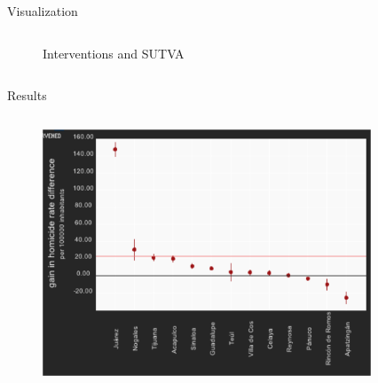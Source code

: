 \documentclass[final]{beamer}
\newlength{\onecolwid}
\newlength{\twocolwid}
\begin{document}
\begin{frame}[t]
\begin{columns}[t]
\begin{column}{\twocolwid}
\begin{block}{ Visualization }
\begin{columns}[t,totalwidth=\twocolwid]
\begin{column}{\onecolwid}
\begin{figure}[htdp]
	              \caption*{Interventions and SUTVA}
            \end{figure}
          \end{column}
		\end{columns}
	\end{block}
	\begin{block}{Results}
		\begin{columns}[t,totalwidth=\twocolwid]
	          \begin{column}{\onecolwid}
	            \begin{figure}[htdp]
	              \includegraphics[scale=1.3]{../Images/results.png}
	            \end{figure}
	        \end{column}
\begin{column}{\onecolwid}
	            \begin{figure}[htdp]
	              {\raggedright
	              \begin{minipage}[ht]{0.58\linewidth}
\end{minipage}}
\end{figure}
\end{column}
\end{columns}
\end{block}
\end{column}
\end{columns}
\end{frame}
\end{document}
